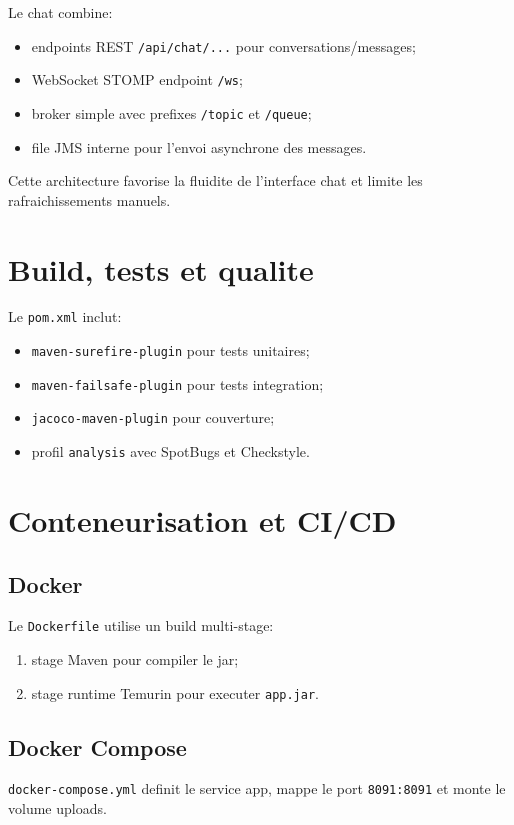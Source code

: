 Le chat combine:
\begin{itemize}[leftmargin=*]
  \item endpoints REST \texttt{/api/chat/...} pour conversations/messages;
  \item WebSocket STOMP endpoint \texttt{/ws};
  \item broker simple avec prefixes \texttt{/topic} et \texttt{/queue};
  \item file JMS interne pour l'envoi asynchrone des messages.
\end{itemize}

Cette architecture favorise la fluidite de l'interface chat et limite les rafraichissements manuels.

\section{Build, tests et qualite}

Le \texttt{pom.xml} inclut:
\begin{itemize}[leftmargin=*]
  \item \texttt{maven-surefire-plugin} pour tests unitaires;
  \item \texttt{maven-failsafe-plugin} pour tests integration;
  \item \texttt{jacoco-maven-plugin} pour couverture;
  \item profil \texttt{analysis} avec SpotBugs et Checkstyle.
\end{itemize}

\section{Conteneurisation et CI/CD}

\subsection*{Docker}
Le \texttt{Dockerfile} utilise un build multi-stage:
\begin{enumerate}[leftmargin=*]
  \item stage Maven pour compiler le jar;
  \item stage runtime Temurin pour executer \texttt{app.jar}.
\end{enumerate}

\subsection*{Docker Compose}
\texttt{docker-compose.yml} definit le service app, mappe le port \texttt{8091:8091} et monte le volume uploads.

